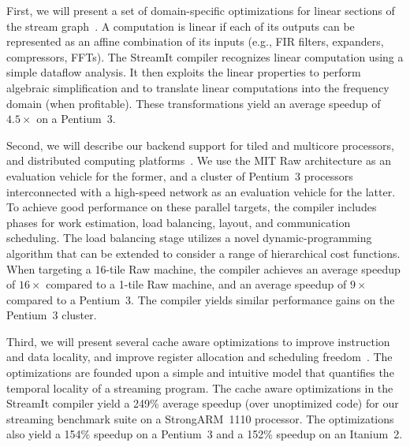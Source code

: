 \documentclass[times,10pt]{tr}
\begin{document}
First, we will present a set of domain-specific optimizations for linear
sections of the stream graph~\cite{lamb-pldi-2003,sitij-thesis}.  A
computation is linear if each of its outputs can be represented as an
affine combination of its inputs (e.g., FIR filters, expanders,
compressors, FFTs).  The StreamIt compiler recognizes linear computation
using a simple dataflow analysis.  It then exploits the linear
properties to perform algebraic simplification and
to translate linear computations into the frequency domain (when
profitable).  These transformations yield an average speedup of $4.5\times$
on a Pentium~3.

Second, we will describe our backend support for tiled and multicore
processors, and distributed computing
platforms~\cite{streamit-asplos}. We use the MIT Raw architecture as
an evaluation vehicle for the former, and a cluster of Pentium~3
processors interconnected with a high-speed network as an evaluation
vehicle for the latter. To achieve good performance on these parallel
targets, the compiler includes phases for work estimation, load
balancing, layout, and communication scheduling.  The load balancing
stage utilizes a novel dynamic-programming algorithm that can be
extended to consider a range of hierarchical cost functions.  When
targeting a 16-tile Raw machine, the compiler achieves an average
speedup of $16\times$ compared to a 1-tile Raw machine, and an average
speedup of $9\times$ compared to a Pentium~3. The compiler yields similar
performance gains on the Pentium~3 cluster.

Third, we will present several cache aware optimizations to improve
instruction and data locality, and improve register allocation and
scheduling freedom~\cite{sermulins-lctes-2005}. The optimizations are
founded upon a simple and intuitive model that quantifies the temporal
locality of a streaming program. The cache aware optimizations in the
StreamIt compiler yield a 249\% average speedup (over unoptimized
code) for our streaming benchmark suite on a StrongARM~1110
processor. The optimizations also yield a 154\% speedup on a Pentium~3
and a 152\% speedup on an Itanium~2.


\end{document}
